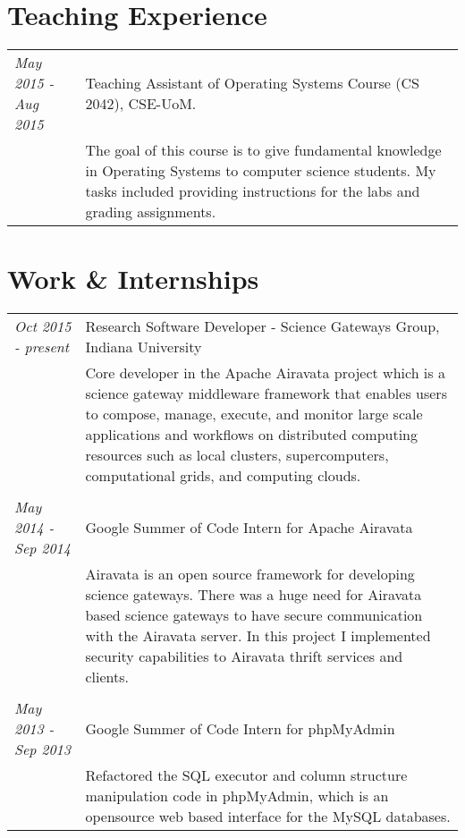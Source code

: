 \documentclass[a4paper,10pt]{article}
\begin{document}
\section{Teaching Experience}
\begin{tabular}{p{3cm}|p{13.5cm}}

\emph{May 2015 - Aug 2015} & Teaching Assistant of Operating Systems Course (CS 2042), CSE-UoM.\\
&\footnotesize{The goal of this course is to give fundamental knowledge in Operating Systems to computer science students. My tasks included providing instructions for the labs and grading assignments.}
\end{tabular}


\section{Work \& Internships}
\begin{tabular}{p{3cm}|p{13.5cm}}

\emph{Oct 2015 - present}& Research Software Developer - Science Gateways Group, Indiana University\\
&\footnotesize{Core developer in the Apache Airavata project which is a science gateway middleware framework that enables users to compose, manage, execute, and monitor large scale applications and workflows on distributed computing resources such as local clusters, supercomputers, computational grids, and computing clouds.}\\\\

\emph{May 2014 - Sep 2014}& Google Summer of Code Intern for Apache Airavata\\
&\footnotesize{Airavata is an open source framework for developing science gateways. There was a huge need for Airavata based science gateways to have secure communication with the Airavata server. In this project I implemented security capabilities to Airavata thrift services and clients.}\\\\


\emph{May 2013 - Sep 2013} & Google Summer of Code Intern for phpMyAdmin 
\\&\footnotesize{Refactored the SQL executor and column structure manipulation code in phpMyAdmin, which is an opensource web based interface for the MySQL databases.}
\end{tabular}
\end{document}

